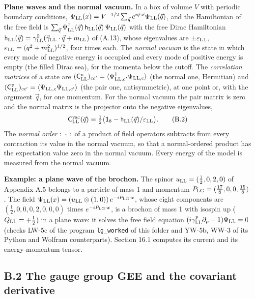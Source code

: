 \documentclass[
  10pt,
]{article}
\begin{document}
\textbf{Plane waves and the normal vacuum.} In a box of volume \(V\)
with periodic boundary conditions,
\(\Psi_{\rm LL}(x)=V^{-1/2}\sum_{\vec q}e^{i\vec q\cdot\vec x}\Psi_{\rm LL}(\vec q)\),
and the Hamiltonian of the free field is
\(\sum_{\vec q}\Psi^\dagger_{\rm LL}(\vec q)\,\mathsf h_{\rm LL}(\vec q)\,\Psi_{\rm LL}(\vec q)\)
with the free Dirac Hamiltonian
\(\mathsf h_{\rm LL}(\vec q)=\gamma^0_{\rm LL}(\vec\gamma_{\rm LL}\cdot\vec q+m_{\rm LL})\)
of (A.13), whose eigenvalues are \(\pm\varepsilon_{\rm LL}\),
\(\varepsilon_{\rm LL}=(q^2+m_{\rm LL}^2)^{1/2}\), four times each. The
\emph{normal vacuum} is the state in which every mode of negative energy
is occupied and every mode of positive energy is empty (the filled Dirac
sea), for the momenta below the cutoff. The \emph{correlation matrices}
of a state are
\((\mathsf C^{\rm n}_{\rm LL})_{cc'}=\langle\Psi^\dagger_{{\rm LL},c'}\Psi_{{\rm LL},c}\rangle\)
(the normal one, Hermitian) and
\((\mathsf C^{\rm p}_{\rm LL})_{cc'}=\langle\Psi_{{\rm LL},c}\Psi_{{\rm LL},c'}\rangle\)
(the pair one, antisymmetric), at one point or, with the argument
\(\vec q\), for one momentum. For the normal vacuum the pair matrix is
zero and the normal matrix is the projector onto the negative
eigenvalues,
\[\mathsf C^{\rm vac}_{\rm LL}(\vec q)=\tfrac12\big(\mathsf 1_8-\mathsf h_{\rm LL}(\vec q)/\varepsilon_{\rm LL}\big).\tag{B.2}\]
The \emph{normal order} \(:\,\cdot\,:\) of a product of field operators
subtracts from every contraction its value in the normal vacuum, so that
a normal-ordered product has the expectation value zero in the normal
vacuum. Every energy of the model is measured from the normal vacuum.

\textbf{Example: a plane wave of the brochon.} The spinor
\(u_{\rm LL}=(\tfrac{1}{2},0,2,0)\) of Appendix A.5 belongs to a
particle of mass 1 and momentum
\(P_{\rm LG}=(\tfrac{17}{8},0,0,\tfrac{15}{8})\). The field
\(\Psi_{\rm LL}(x)=(u_{\rm LL}\otimes(1,0))\,e^{-iP_{\rm LG}\cdot x}\),
whose eight components are \((\tfrac{1}{2},0,0,0,2,0,0,0)\) times
\(e^{-iP_{\rm LG}\cdot x}\), is a brochon of mass 1 with isospin up
(\(Q_{\rm LL}=+\tfrac12\)) in a plane wave: it solves the free field
equation \((i\gamma^p_{\rm LL}\partial_p-1)\Psi_{\rm LL}=0\) (checks
LW-5c of the program \texttt{lg\_worked} of this folder and YW-5b, WW-3
of its Python and Wolfram counterparts). Section 16.1 computes its
current and its energy-momentum tensor.

\hypertarget{b.2-the-gauge-group-gee-and-the-covariant-derivative}{%
\subsection{B.2 The gauge group GEE and the covariant
derivative}\label{b.2-the-gauge-group-gee-and-the-covariant-derivative}}
\end{document}
